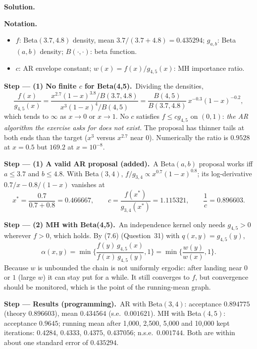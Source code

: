 \documentclass[11pt,a4paper]{article}
\numberwithin{equation}{questao}   %
\newenvironment{notacao}{\par\smallskip\noindent\textbf{Notation.}\begin{itemize}[leftmargin=1.4em,topsep=1pt,itemsep=0pt]\small}{\end{itemize}}
\newcommand{\passo}[2]{\par\smallskip\noindent\textbf{Step --- #1.}~#2}
\newcommand{\solhead}{\par\medskip\noindent{\color{blue!55!black}\rule{\linewidth}{0.3pt}}\par\noindent\textbf{Solution.}}
\newcommand{\1}{\mathbf{1}}
\begin{document}
\begin{sol}
\solhead
\begin{notacao}
\item $f$: Beta$(3.7,4.8)$ density, mean $3.7/(3.7+4.8)=0.435294$; $g_{a,b}$: Beta$(a,b)$ density;
  $B(\cdot,\cdot)$: beta function.
\item $c$: AR envelope constant; $w(x)=f(x)/g_{4,5}(x)$: MH importance ratio.
\end{notacao}

\passo{(1) No finite $c$ for Beta(4,5)}{Dividing the densities,}
\begin{equation}\label{q32:ratio45}
\frac{f(x)}{g_{4,5}(x)}=\frac{x^{2.7}(1-x)^{3.8}/B(3.7,4.8)}{x^{3}(1-x)^{4}/B(4,5)}=\frac{B(4,5)}{B(3.7,4.8)}\,x^{-0.3}(1-x)^{-0.2},
\end{equation}
which tends to $\infty$ as $x\to0$ or $x\to1$. No $c$ satisfies $f\le cg_{4,5}$ on $(0,1)$: \emph{the AR
algorithm the exercise asks for does not exist.} The proposal has thinner tails at both ends than
the target ($x^3$ versus $x^{2.7}$ near 0). Numerically the ratio is $0.9528$ at $x=0.5$ but $169.2$
at $x=10^{-8}$.

\passo{(1) A valid AR proposal (added)}{A Beta$(a,b)$ proposal works iff $a\le3.7$ and $b\le4.8$. With
Beta$(3,4)$, $f/g_{3,4}\propto x^{0.7}(1-x)^{0.8}$; its log-derivative $0.7/x-0.8/(1-x)$ vanishes at}
\begin{equation}\label{q32:xstar}
x^*=\frac{0.7}{0.7+0.8}=0.466667,\qquad c=\frac{f(x^*)}{g_{3,4}(x^*)}=1.115321,\qquad \frac1c=0.896603 .
\end{equation}

\passo{(2) MH with Beta(4,5)}{An independence kernel only needs $g_{4,5}>0$ wherever $f>0$, which
holds. By (7.6) (Question~31) with $q(x,y)=g_{4,5}(y)$,}
\begin{equation}\label{q32:mh}
\alpha(x,y)=\min\Big\{\frac{f(y)\,g_{4,5}(x)}{f(x)\,g_{4,5}(y)},1\Big\}=\min\Big\{\frac{w(y)}{w(x)},1\Big\}.
\end{equation}
Because $w$ is unbounded the chain is not uniformly ergodic: after landing near $0$ or $1$ (large
$w$) it can stay put for a while. It still converges to $f$, but convergence should be monitored,
which is the point of the running-mean graph.

\passo{Results (programming)}{AR with Beta$(3,4)$: acceptance $0.894775$ (theory $0.896603$), mean
$0.434564$ (s.e.\ $0.001621$). MH with Beta$(4,5)$: acceptance $0.9645$; running mean after
1{,}000, 2{,}500, 5{,}000 and 10{,}000 kept iterations: $0.4284$, $0.4333$, $0.4375$, $0.437056$;
n.s.e.\ $0.001744$. Both are within about one standard error of $0.435294$.}


\end{sol}
\end{document}
